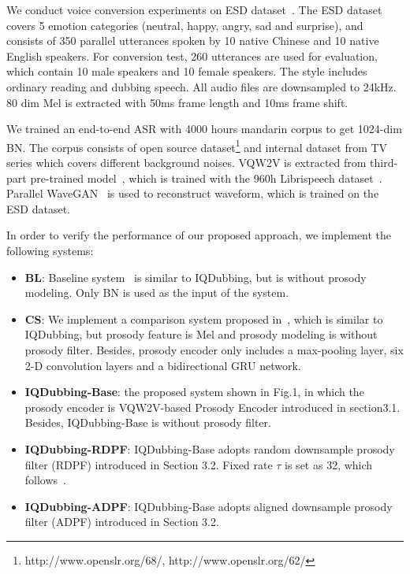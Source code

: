 \documentclass{article}
\begin{document}
We conduct voice conversion experiments on ESD dataset~\cite{zhou2021emotional}. The ESD dataset covers 5 emotion categories (neutral, happy, angry, sad and surprise), and consists of 350 parallel utterances spoken by 10 native Chinese and 10 native English speakers. For conversion test, 260 utterances are used for evaluation, which contain 10 male speakers and 10 female speakers. The style includes ordinary reading and dubbing speech. All audio files are downsampled to 24kHz. 80 dim Mel is extracted with 50ms frame length and 10ms frame shift.

We trained an end-to-end ASR with 4000 hours mandarin corpus to get 1024-dim BN. The corpus consists of open source dataset\footnote{http://www.openslr.org/68/,  http://www.openslr.org/62/} and internal dataset from TV series which covers different background noises. VQW2V is extracted from third-part pre-trained model~\cite{baevski2019vq}, which is trained with the 960h Librispeech dataset~\cite{panayotov2015librispeech}.  Parallel WaveGAN~\cite{yamamoto2020parallel} is used to reconstruct waveform, which is trained on the ESD dataset.


In order to verify the performance of our proposed approach, we implement the following systems:
\begin{itemize}
\setlength{\itemsep}{0pt}
    \item \textbf{BL}: Baseline system~\cite{sun2016phonetic} is similar to IQDubbing, but is without prosody modeling. Only BN is used as the input of the system.
	\item \textbf{CS}: We implement a comparison system proposed in~\cite{lian2021towards}, which is similar to IQDubbing, but prosody feature is Mel and prosody modeling is without prosody filter. Besides, prosody encoder only includes a max-pooling layer, six 2-D convolution layers and a bidirectional GRU network.
	\item \textbf{IQDubbing-Base}: the proposed system shown in Fig.1,  in which the prosody encoder is VQW2V-based Prosody Encoder introduced in section3.1. Besides, IQDubbing-Base is without prosody filter.  
	\item \textbf{IQDubbing-RDPF}: IQDubbing-Base adopts random downsample prosody filter (RDPF) introduced in Section 3.2. Fixed rate $\tau$ is set as 32, which follows~\cite{dai2021information}. 
	\item \textbf{IQDubbing-ADPF}: IQDubbing-Base adopts aligned downsample prosody filter (ADPF) introduced in Section 3.2.
\end{itemize}
\end{document}
